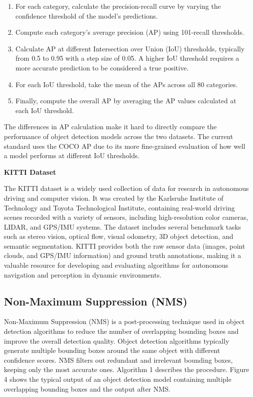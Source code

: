 \documentclass{article}
\begin{document}
\begin{enumerate}
    \item For each category, calculate the precision-recall curve by varying the confidence threshold of the model’s predictions.
    \item Compute each category’s average precision (AP) using 101-recall thresholds.
    \item Calculate AP at different Intersection over Union (IoU) thresholds, typically from 0.5 to 0.95 with a step size of 0.05. A higher IoU threshold requires a more accurate prediction to be considered a true positive.
    \item For each IoU threshold, take the mean of the APs across all 80 categories.
    \item Finally, compute the overall AP by averaging the AP values calculated at each IoU threshold.
\end{enumerate}

The differences in AP calculation make it hard to directly compare the performance of object detection models across the two datasets. The current standard uses the COCO AP due to its more fine-grained evaluation of how well a model performs at different IoU thresholds.

\textbf{KITTI Dataset}

The KITTI dataset is a widely used collection of data for research in autonomous driving and computer vision. It was created by the Karlsruhe Institute of Technology and Toyota Technological Institute, containing real-world driving scenes recorded with a variety of sensors, including high-resolution color cameras, LIDAR, and GPS/IMU systems. The dataset includes several benchmark tasks such as stereo vision, optical flow, visual odometry, 3D object detection, and semantic segmentation. KITTI provides both the raw sensor data (images, point clouds, and GPS/IMU information) and ground truth annotations, making it a valuable resource for developing and evaluating algorithms for autonomous navigation and perception in dynamic environments.

\subsection{Non-Maximum Suppression (NMS)}

Non-Maximum Suppression (NMS) is a post-processing technique used in object detection algorithms to reduce the number of overlapping bounding boxes and improve the overall detection quality. Object detection algorithms typically generate multiple bounding boxes around the same object with different confidence scores. NMS filters out redundant and irrelevant bounding boxes, keeping only the most accurate ones. Algorithm 1 describes the procedure. Figure 4 shows the typical output of an object detection model containing multiple overlapping bounding boxes and the output after NMS.
\end{document}
